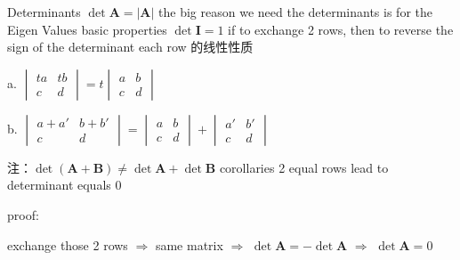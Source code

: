 \documentclass[12pt, a4paper]{article}
\begin{document}
{\noindent Determinants \quad $\det{{\mathbf{A}}} = \left|{\mathbf{A}}\right|$
\vspace{14pt}
\newline
the big reason we need the determinants is for the Eigen Values
\vspace{14pt}
 basic properties
\newline
{} {\textcolor{anhao-purple}{$\det{{\mathbf{I}}} = 1$}}
\newline
{} {\textcolor{anhao-purple}{if to exchange 2 rows, then to reverse the sign of the determinant}}
\newline
{} {\textcolor{anhao-scarlet}{each row }}的{\textcolor{anhao-purple}{线性性质}}
\par a. 
\begin{math}
	\begin{vmatrix}
		ta & tb \\
		c & d
	\end{vmatrix}
	 = 
	t
	\begin{vmatrix}
		a & b \\
		c & d
	\end{vmatrix}
\end{math}
\par b.
\begin{math}
	\begin{vmatrix}
		a+a' & b+b' \\
		c & d
	\end{vmatrix}
	 = 
	\begin{vmatrix}
		a & b \\
		c & d
	\end{vmatrix}
	 + 
	\begin{vmatrix}
		a' & b' \\
		c & d
	\end{vmatrix}
\end{math}
\par {\textcolor{anhao-scarlet}{注：$\det{({\mathbf{A+B}})} \neq \det{{\mathbf{A}}}+\det{{\mathbf{B}}}$}}
\vspace{14pt}
 corollaries
\newline
{} {\textcolor{anhao-purple}{2 equal rows lead to determinant equals 0}}
\par proof:
\par\qquad exchange those 2 rows $\Longrightarrow$ same matrix $\Longrightarrow$ $\det{{\mathbf{A}}} = -\det{{\mathbf{A}}}$ $\Longrightarrow$ $\det{{\mathbf{A}}} = 0$
}
\end{document}
